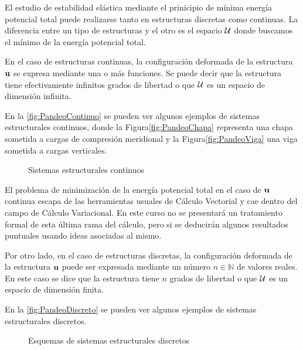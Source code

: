 El estudio de estabilidad elástica mediante el prinicipio de mínima energía potencial total puede realizarse tanto en estructuras discretas como continuas. La diferencia entre un tipo de estructuras y el otro es el espacio ${\mathcal U}$ donde buscamos el mínimo de la energía potencial total.

En el caso de estructuras continuas, la configuración deformada de la estructura ${\bf u}$ se expresa mediante una o más funciones. Se puede decir que la estructura tiene efectivamente infinitos grados de libertad o que ${\mathcal U}$ es un espacio de dimensión infinita.

En la \autoref{fig:PandeoContinuo} se pueden ver algunos ejemplos de sistemas estructurales continuos, donde la Figura\autoref{fig:PandeoChapa} representa una chapa sometida a cargas de compresión meridional y la Figura\autoref{fig:PandeoViga} una viga sometida a cargas verticales.

\begin{figure}[htb]
	\centering
{}
\hspace{1em}
\caption{Sistemas estructurales continuos}
	\label{fig:PandeoContinuo}
\end{figure}

El problema de minimización de la energía potencial total en el caso de ${\bf u}$ continua escapa de las herramientas usuales de Cálculo Vectorial y cae dentro del campo de Cálculo Variacional. En este curso no se presentará un tratamiento formal de esta última rama del cálculo, pero si se deducirán algunos resultados puntuales usando ideas asociadas al mismo.

Por otro lado, en el caso de estructuras discretas, la configuración deformada de la estructura ${\bf u}$ puede ser expresada mediante un número $n\in\mathbb{N}$ de valores reales. En este caso se dice que la estructura tiene $n$ grados de libertad o que ${\mathcal U}$ es un espacio de dimensión finita.

En la \autoref{fig:PandeoDiscreto} se pueden ver algunos ejemplos de sistemas estructurales discretos.

\begin{figure}[htb]
	\centering
{}
\hspace{6em}
\caption{Esquemas de sistemas estructurales discretos}
	\label{fig:PandeoDiscreto}
\end{figure}

